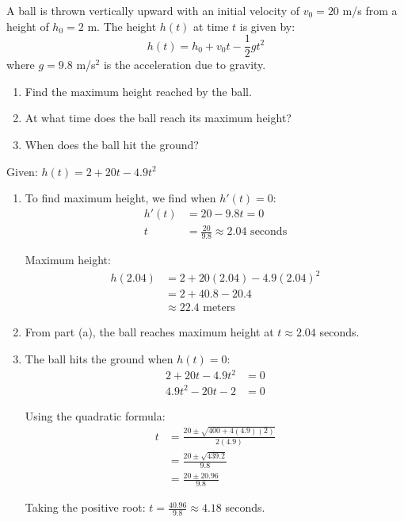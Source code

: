\begin{problem}[Kinematics]
A ball is thrown vertically upward with an initial velocity of $v_0 = 20$ m/s from a height of $h_0 = 2$ m. The height $h(t)$ at time $t$ is given by:
\[
h(t) = h_0 + v_0 t - \frac{1}{2}gt^2
\]
where $g = 9.8$ m/s$^2$ is the acceleration due to gravity.

\begin{enumerate}[label=(\alph*)]
    \item Find the maximum height reached by the ball.
    \item At what time does the ball reach its maximum height?
    \item When does the ball hit the ground?
\end{enumerate}
\end{problem}

\begin{solution}
Given: $h(t) = 2 + 20t - 4.9t^2$

\begin{enumerate}[label=(\alph*)]
    \item To find maximum height, we find when $h'(t) = 0$:
    \begin{align*}
        h'(t) &= 20 - 9.8t = 0 \\
        t &= \frac{20}{9.8} \approx 2.04 \text{ seconds}
    \end{align*}

    Maximum height:
    \begin{align*}
        h(2.04) &= 2 + 20(2.04) - 4.9(2.04)^2 \\
        &= 2 + 40.8 - 20.4 \\
        &\approx 22.4 \text{ meters}
    \end{align*}

    \item From part (a), the ball reaches maximum height at $t \approx 2.04$ seconds.

    \item The ball hits the ground when $h(t) = 0$:
    \begin{align*}
        2 + 20t - 4.9t^2 &= 0 \\
        4.9t^2 - 20t - 2 &= 0
    \end{align*}

    Using the quadratic formula:
    \begin{align*}
        t &= \frac{20 \pm \sqrt{400 + 4(4.9)(2)}}{2(4.9)} \\
        &= \frac{20 \pm \sqrt{439.2}}{9.8} \\
        &= \frac{20 \pm 20.96}{9.8}
    \end{align*}

    Taking the positive root: $t = \frac{40.96}{9.8} \approx 4.18$ seconds.
\end{enumerate}
\end{solution}

